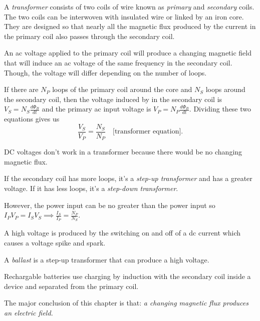 \begin{definition}[Transformer]
    A \emph{transformer} consists of two coils of wire known as \emph{primary} and \emph{secondary} coils. The two coils can be interwoven with insulated wire or linked by an iron core. They are designed so that nearly all the magnetic flux produced by the current in the primary coil also passes through the secondary coil. 
    
    An ac voltage applied to the primary coil will produce a changing magnetic field that will induce an ac voltage of the same frequency in the secondary coil. Though, the voltage will differ depending on the number of loops. 
    
    If there are $N_P$ loops of the primary coil around the core and $N_S$ loops around the secondary coil, then the voltage induced by in the secondary coil is $V_S = N_S\frac{d\Phi_B}{dt}$ and the  primary ac input voltage is $V_P = N_P\frac{d\Phi_B}{dt}$. Dividing these two equations gives us $$\frac{V_S}{V_P} = \frac{N_S}{N_P} \quad \text{[transformer equation]}.$$
\end{definition}
\begin{note}
    DC voltages don't work in a transformer because there would be no changing magnetic flux.
\end{note}
\begin{definition}
    If the secondary coil has more loops, it's a \emph{step-up transformer} and has a greater voltage. If it has less loops, it's a \emph{step-down transformer}.

    However, the power input can be no greater than the power input so $I_PV_P = I_SV_S \implies \frac{I_S}{I_P} = \frac{N_P}{N_S}$.
\end{definition}
\begin{definition}
    A high voltage is produced by the switching on and off of a dc current which causes a voltage spike and spark.

    A \emph{ballast} is a step-up transformer that can produce a high voltage.
\end{definition}
\begin{remark}
    Rechargable batteries use charging by induction with the secondary coil inside a device and separated from the primary coil.
\end{remark}
\begin{remark}
    The major conclusion of this chapter is that: \emph{a changing magnetic flux produces an electric field.}
\end{remark}
